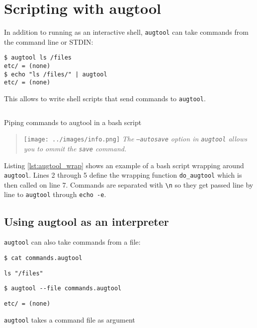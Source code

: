 \section{Scripting with augtool}


In addition to running as an interactive shell, \verb!augtool! can take commands from the command line or STDIN:

 

\begin{verbatim}
$ augtool ls /files
etc/ = (none)
$ echo "ls /files/" | augtool
etc/ = (none)
\end{verbatim}

This allows to write shell scripts that send commands to \verb!augtool!.

  

\begin{listing}[H]
  \inputminted[linenos,frame=leftline]{bash}{listings/augtool_wrap.sh}
  \caption{Piping commands to augtool in a bash script}
  \label{lst:augtool_wrap}
\end{listing}


\begin{quote}
\texttt{[image: ../images/info.png]} \emph{The \texttt{--autosave} option in \texttt{augtool} allows you to ommit the \texttt{save} command.}
\end{quote}

Listing \ref{lst:augtool_wrap} shows an example of a bash script wrapping around \verb!augtool!. Lines 2 through 5 define the wrapping function \verb!do_augtool! which is then called on line 7. Commands are separated with \verb!\n! so they get passed line by line to \verb!augtool! through \verb!echo -e!.


\subsection{Using augtool as an interpreter}

\verb!augtool! can also take commands from a file:

 

\begin{listing}
  \begin{verbatim}
$ cat commands.augtool
  \end{verbatim}
  \begin{verbatim}
ls "/files"
  \end{verbatim}
  \begin{verbatim}
$ augtool --file commands.augtool
  \end{verbatim}
  \begin{verbatim}
etc/ = (none)
  \end{verbatim}
  \caption{\texttt{augtool} takes a command file as argument}
  \label{lst:augtool_file_arg}
\end{listing}

